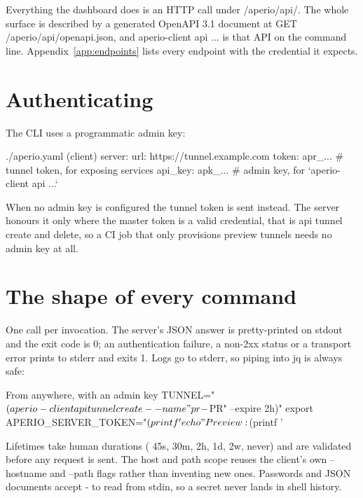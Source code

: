 \documentclass[11pt,a4paper,oneside]{book}
\newcommand{\aperiobreakableunderscore}{\textunderscore\allowbreak}
\newcommand{\aperiocodebreaks}{\XeTeXinterchartokenstate=1 }
\newcommand{\aperiocodebreaks}{}
\DeclareRobustCommand{\code}[1]{{\ttfamily\small\aperiocodebreaks
  \let\_\aperiobreakableunderscore#1}}
\begin{document}
Everything the dashboard does is an HTTP call under \code{/aperio/api/}.
The whole surface is described by a generated OpenAPI 3.1 document at
\code{GET /aperio/api/openapi.json}, and \code{aperio-client api ...} is
that API on the command line. Appendix~\ref{app:endpoints} lists every
endpoint with the credential it expects.

\section{Authenticating}

The CLI uses a programmatic admin key:

\begin{codecard}[aperioyaml]{./aperio.yaml (client)}
server:
  url: https://tunnel.example.com
  token: apr_...      # tunnel token, for exposing services
  api_key: apk_...    # admin key, for `aperio-client api ...`
\end{codecard}

When no admin key is configured the tunnel token is sent instead. The
server honours it only where the master token is a valid credential, that
is \code{api tunnel create} and \code{delete}, so a CI job that only
provisions preview tunnels needs no admin key at all.

\section{The shape of every command}

One call per invocation. The server's JSON answer is pretty-printed on
stdout and the exit code is \code{0}; an authentication failure, a
non-2xx status or a transport error prints to stderr and exits \code{1}.
Logs go to stderr, so piping into \code{jq} is always safe:

\begin{codecard}[aperiosh]{From anywhere, with an admin key}
TUNNEL="$(aperio-client api tunnel create --name "pr-$PR" --expire 2h)"
export APERIO_SERVER_TOKEN="$(printf '%
echo "Preview: $(printf '%
\end{codecard}

Lifetimes take human durations (\code{45s}, \code{30m}, \code{2h},
\code{1d}, \code{2w}, \code{never}) and are validated before any request
is sent. The host and path scope reuses the client's own
\code{--hostname} and \code{--path} flags rather than inventing new ones.
Passwords and JSON documents accept \code{-} to read from stdin, so a
secret never lands in shell history.
\end{document}
